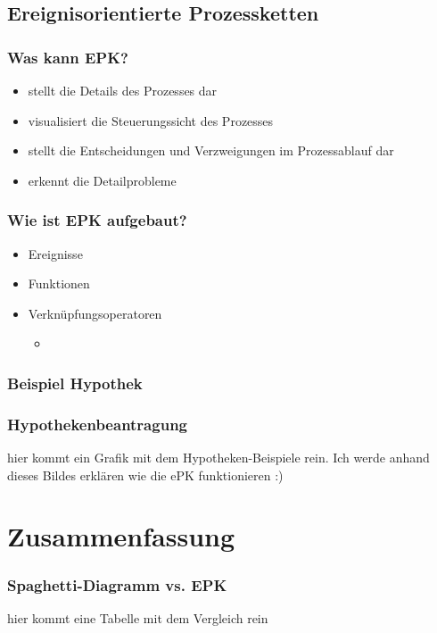 \documentclass{beamer}
\begin{document}
 \subsection[Ereignisorientierte Prozessketten]{Ereignisorientierte Prozessketten}
 \begin{frame}
  \frametitle{Was kann EPK?}
  \begin{itemize}
  \item stellt die Details des Prozesses dar
  \item visualisiert die Steuerungssicht des Prozesses
  \item stellt die Entscheidungen und Verzweigungen im Prozessablauf dar
  \item erkennt die Detailprobleme
  \end{itemize}
 \end{frame}
 
  \begin{frame}
  \frametitle{Wie ist EPK aufgebaut?}
  \begin{itemize}
  \item Ereignisse
  \item Funktionen
  \item Verknüpfungsoperatoren
  \begin{itemize}
  	\item
  \end{itemize}
  \end{itemize}
 \end{frame}
 

 
 \subsubsection{Beispiel Hypothek}
  \begin{frame}
  \frametitle{Hypothekenbeantragung}
hier kommt ein Grafik mit dem Hypotheken-Beispiele rein. Ich werde anhand dieses Bildes erklären wie die ePK funktionieren :)
 \end{frame}

\section[Zusammenfassung]{Zusammenfassung}
 \begin{frame}
  \frametitle{Spaghetti-Diagramm vs. EPK}
  hier kommt eine Tabelle mit dem Vergleich rein
  
  \end{frame}
  
\end{document}
